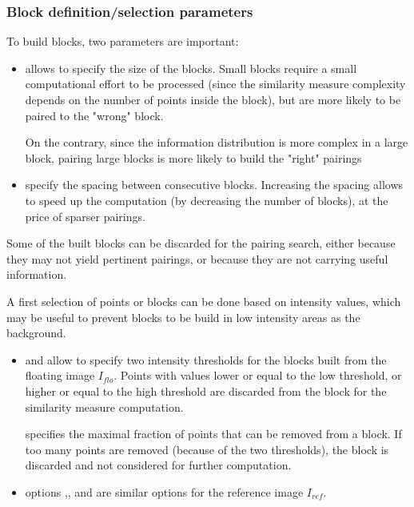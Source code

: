 \subsubsection{Block definition/selection parameters}
\label{sec:parameters:block:definition}


To build blocks, two parameters are important:
\begin{itemize}
\item[]  allows to specify the size of the blocks. Small blocks require a small computational effort to be processed (since the similarity measure complexity depends on the number of points inside the block), but are more likely to be paired to the "wrong" block. 

On the contrary, since the information distribution is more complex in a large block, pairing large blocks is more likely to build the "right" pairings
\item[]  specify the spacing between consecutive blocks. Increasing the spacing allows to speed up the computation (by decreasing the number of blocks), at the price of sparser pairings. 
\end{itemize}

Some of the built blocks can be discarded for the pairing search, either because they may not yield pertinent pairings, or because they are not carrying useful information.

A first selection of points or blocks can be done based on intensity values, which may be useful to prevent blocks to be build in low intensity areas as the background.

\begin{itemize}
\item[]  and  allow to specify two intensity thresholds for the blocks built from the floating image $I_{flo}$. Points with values lower or equal to the low threshold, or higher or equal to the high threshold are discarded from the block for the similarity measure computation. 

 specifies the maximal fraction of points that can be removed from a block. If too many points are removed (because of the two thresholds), the block is discarded and not considered for further computation.

\item[] options ,, and  are similar options for the reference image $I_{ref}$.

\end{itemize}

